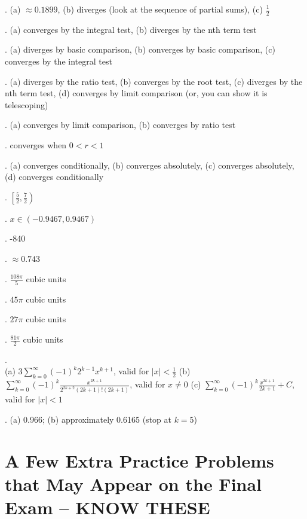 \documentclass[12pt]{article}
\begin{document}
.  (a) $\approx 0.1899$, (b) diverges (look at the sequence of 
partial sums), (c) ${\frac{1}{2}}$
\medskip

.  (a) converges by the integral test, (b) diverges by the nth term 
test
\medskip

.  (a) diverges by basic comparison, (b) converges by basic 
comparison, (c) converges by the integral test
\medskip

.  (a) diverges by the ratio test, (b) converges by the root test, 
(c) diverges by the nth term test, (d) converges by limit comparison (or, you can 
show it is telescoping)
\medskip

.  (a) converges by limit comparison, (b) converges by ratio test
\medskip

.  converges when $0<r<1$
\medskip

.  (a) converges conditionally, (b) converges absolutely, (c) 
converges absolutely, (d) converges conditionally
\medskip

.  $\left [ {\frac{5}{2}}, {\frac{7}{2}} \right )$
\medskip

.  $x \in (-0.9467, 0.9467)$
\medskip

.  -840
\medskip

.  $\approx 0.743$
\medskip

.  ${\frac{108 \pi}{5}}$ cubic units
\medskip

.  $45 \pi$ cubic units
\medskip

.  $27 \pi$ cubic units
\medskip

.  ${\frac{81 \pi}{2}}$ cubic units
\medskip

.\\
(a) $3 \sum_{k=0}^{\infty} (-1)^k2^{k-1}x^{k+1}$, valid
for $|x|<{\frac{1}{2}}$ \hfil\break
(b) $\sum_{k=0}^{\infty} (-1)^k {\frac{x^{2k+1}}
{2^{2k+2}(2k+1)!(2k+1)}}$, valid for $x \neq 0$ \hfil\break
(c) $\sum_{k=0}^{\infty}
(-1)^k {\frac{x^{2k+1}}{2k+1}} + C$, valid for $|x|<1$ 
\medskip

.  (a) 0.966; (b) approximately 0.6165 (stop at $k=5$)

\section{A Few Extra Practice Problems that May Appear on the Final Exam -- KNOW THESE}
\end{document}
